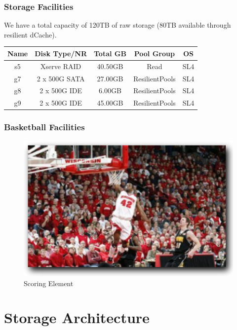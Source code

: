 \documentclass{beamer}
\begin{document}
\begin{frame}
\frametitle{Storage Facilities}
We have a total capacity of 120TB of raw storage (80TB available through 
resilient dCache).

\vspace{.4cm}

\begin{center}
\begin{tabular}[c]{|c|c|c|c|c|}
\hline
{\bf Name}   & {\bf Disk Type/NR} & {\bf Total GB}  & {\bf Pool Group}  & {\bf OS} \\
\hline
s5  & Xserve RAID   & 40.50GB   & Read              & SL4 \\
g7  & 2 x 500G SATA & 27.00GB   & ResilientPools    & SL4 \\
g8  & 2 x 500G IDE  & 6.00GB    & ResilientPools    & SL4 \\
g9  & 2 x 500G IDE  & 45.00GB   & ResilientPools    & SL4 \\
\hline
\end{tabular}
\end{center}
\end{frame}

\begin{frame}
\frametitle{Basketball Facilities}
\begin{figure}
    \includegraphics*{Graphics/tucker.png}
    \caption{Scoring Element}
\end{figure}
\end{frame}

\section{Storage Architecture}
\end{document}
